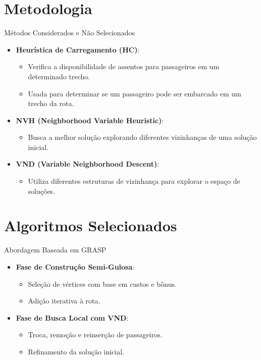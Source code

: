 \documentclass[aspectratio=169,xcolor=table]{beamer}
\begin{document}
\section{Metodologia}
\begin{frame}{Métodos Considerados e Não Selecionados}
    \begin{itemize}
        \item \textbf{Heurística de Carregamento (HC)}:
        \begin{itemize}
            \item Verifica a disponibilidade de assentos para passageiros em um determinado trecho.
            \item Usada para determinar se um passageiro pode ser embarcado em um trecho da rota.
        \end{itemize}
        \item \textbf{NVH (Neighborhood Variable Heuristic)}:
        \begin{itemize}
            \item Busca a melhor solução explorando diferentes vizinhanças de uma solução inicial.
        \end{itemize}
        \item \textbf{VND (Variable Neighborhood Descent)}:
        \begin{itemize}
            \item Utiliza diferentes estruturas de vizinhança para explorar o espaço de soluções.
        \end{itemize}
    \end{itemize}
\end{frame}

\section{Algoritmos Selecionados}

\begin{frame}{Abordagem Baseada em GRASP}
    \begin{itemize}
        \item \textbf{Fase de Construção Semi-Gulosa}:
        \begin{itemize}
            \item Seleção de vértices com base em custos e bônus.
            \item Adição iterativa à rota.
        \end{itemize}
        \item \textbf{Fase de Busca Local com VND}:
        \begin{itemize}
            \item Troca, remoção e reinserção de passageiros.
            \item Refinamento da solução inicial.
        \end{itemize}
    \end{itemize}
\end{frame}
\end{document}
